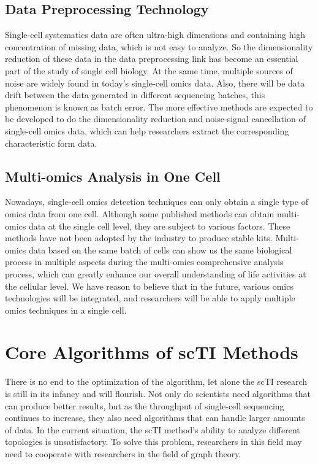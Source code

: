 \subsection{Data Preprocessing Technology}
 
Single-cell systematics data are often ultra-high dimensions and containing high concentration of missing data, which is not easy to analyze. So the dimensionality reduction of these data in the data preprocessing link has become an essential part of the study of single cell biology. At the same time, multiple sources of noise are widely found in today's single-cell omics data. Also, there will be data drift between the data generated in different sequencing batches, this phenomenon is known as batch error. The more effective methods are expected to be developed to do the dimensionality reduction and noise-signal cancellation of single-cell omics data, which can help researchers extract the corresponding characteristic form data. 

\subsection{Multi-omics Analysis in One Cell}
 
Nowadays, single-cell omics detection techniques can only obtain a single type of omics data from one cell. Although some published methods can obtain multi-omics data at the single cell level, they are subject to various factors. These methods have not been adopted by the industry to produce stable kits. Multi-omics data based on the same batch of cells can show us the same biological process in multiple aspects during the multi-omics comprehensive analysis process, which can greatly enhance our overall understanding of life activities at the cellular level. We have reason to believe that in the future, various omics technologies will be integrated, and researchers will be able to apply multiple omics techniques in a single cell.

\section{Core Algorithms of scTI Methods}
 
There is no end to the optimization of the algorithm, let alone the scTI research is still in its infancy and will flourish. Not only do scientists need algorithms that can produce better results, but as the throughput of single-cell sequencing continues to increase, they also need algorithms that can handle larger amounts of data. In the current situation, the scTI method's ability to analyze different topologies is unsatisfactory. To solve this problem, researchers in this field may need to cooperate with researchers in the field of graph theory.


